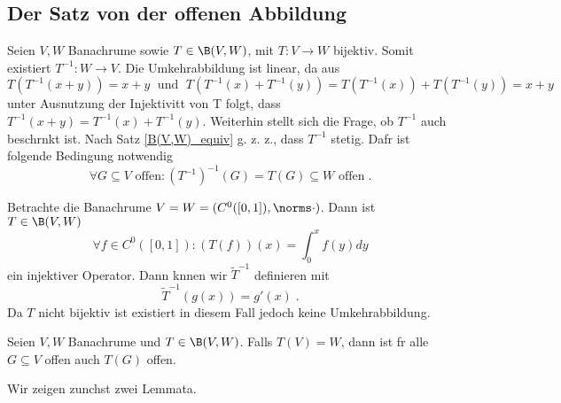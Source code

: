 \begin{theorem}
\section{Der Satz von der offenen Abbildung}

\begin{rem}[Motivation]
	Seien \(V, W\) Banachr\as ume sowie \(T \in \B(V,W)\), mit \(T: V\to W\) bijektiv. Somit existiert \(T^{-1}:W\to V\). Die Umkehrabbildung ist linear, da aus
	\[T(T^{-1}(x+y)) = x +y \;\text{ und }\; T(T^{-1}(x) + T^{-1}(y)) = T(T^{-1}(x)) + T(T^{-1}(y)) = x + y\]
	unter Ausnutzung der Injektivit\as t von T folgt, dass \(T^{-1}(x+y) = T^{-1}(x) + T^{-1}(y)\). Weiterhin stellt sich die Frage, ob \(T^{-1}\) auch beschr\as nkt ist. Nach Satz \ref{B(V,W)_equiv} g. z. z., dass \(T^{-1}\) stetig. Daf\us r ist folgende Bedingung notwendig
	\[\forall G \subseteq V \text{ offen}: (T^{-1})^{-1} (G) = T(G) \subseteq W \text{ offen}\;.\]
\end{rem}
\begin{ex}
	Betrachte die Banachr\as ume \(V= W = (C^0([0,1]), \norms \cdot)\). Dann ist \(T\in \B(V,W)\)
	\[\forall f \in C^0([0,1]): (T(f))(x) = \int_0^x f(y)dy\]
	ein injektiver Operator. Dann k\os nnen wir \(\tilde T^{-1}\) definieren mit
	\[\tilde T^{-1} (g(x)) = g'(x)\;.\]
	Da \(T\) nicht bijektiv ist existiert in diesem Fall jedoch keine Umkehrabbildung.
\end{ex}

\begin{theorem}
	Seien \(V, W\) Banachr\as ume und \(T\in \B(V,W)\). Falls \(T(V) = W\), dann ist f\us r alle \(G\subseteq V\) offen auch \(T(G)\) offen.
	\label{Offene_Abb} \end{theorem}
Wir zeigen zun\as chst zwei Lemmata.


\end{theorem}
